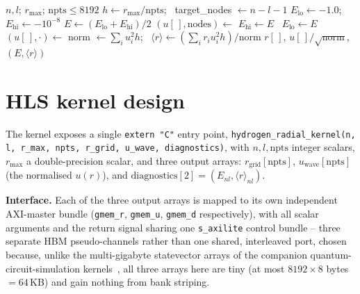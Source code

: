 \documentclass[pdflatex,sn-mathphys,Numbered]{sn-jnl}
\begin{document}
\begin{algorithm}
\caption{Numerov shooting solver for one $(n,l)$ bound state, as implemented in the HLS kernel}\label{alg:numerov}
\begin{algorithmic}[1]
\Require $n,l$; $r_{\max}$; $\text{npts}\le 8192$
\State $h \gets r_{\max}/\text{npts}$; \ target\_nodes $\gets n-l-1$
\State $E_{\text{lo}}\gets -1.0$; \ $E_{\text{hi}}\gets -10^{-8}$
 
    \State $E \gets (E_{\text{lo}}+E_{\text{hi}})/2$
    \State $(u[\,],\text{nodes}) \gets$  
     $E_{\text{hi}}\gets E$ \Else\ $E_{\text{lo}}\gets E$ \EndIf
\EndFor
\State $(u[\,],\cdot) \gets$  
\State norm $\gets \sum_i u_i^2 h$; \ $\langle r\rangle \gets \left(\sum_i r_i u_i^2 h\right)/\text{norm}$ 
\State \Return $r[\,]$, $u[\,]/\sqrt{\text{norm}}$, $(E, \langle r\rangle)$
\end{algorithmic}
\end{algorithm}

\section{HLS kernel design}\label{sec:kernel}

The kernel exposes a single \texttt{extern "C"} entry point, \texttt{hydrogen\_radial\_kernel(n, l, r\_max, npts, r\_grid, u\_wave, diagnostics)}, with $n,l,\text{npts}$ integer scalars, $r_{\max}$ a double-precision scalar, and three output arrays: $r_{\text{grid}}[\text{npts}]$, $u_{\text{wave}}[\text{npts}]$ (the normalised $u(r)$), and $\text{diagnostics}[2]=(E_{nl},\langle r\rangle_{nl})$.

\textbf{Interface.} Each of the three output arrays is mapped to its own independent AXI-master bundle (\texttt{gmem\_r}, \texttt{gmem\_u}, \texttt{gmem\_d} respectively), with all scalar arguments and the return signal sharing one \texttt{s\_axilite} control bundle -- three separate HBM pseudo-channels rather than one shared, interleaved port, chosen because, unlike the multi-gigabyte statevector arrays of the companion quantum-circuit-simulation kernels~\cite{ali_rtl_statevector}, all three arrays here are tiny (at most $8192\times8$ bytes $=64$\,KB) and gain nothing from bank striping.
\end{document}
